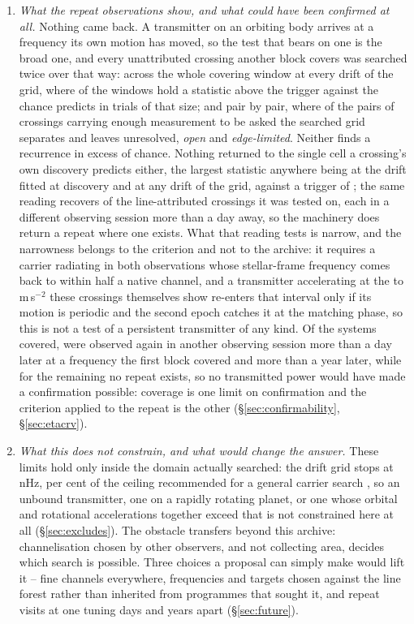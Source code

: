 \begin{enumerate}[leftmargin=1.6em,itemsep=4pt,topsep=4pt,parsep=0pt]
\item \emph{What the repeat observations show, and what could have been
confirmed at all.} Nothing came back. A transmitter on an orbiting body
arrives at a frequency its own motion has moved, so the test that bears on
one is the broad one, and every unattributed crossing another block covers
was searched twice over that way: across the whole covering window at every
drift of the grid, where \WdNExc{} of the \WdNCov{} windows hold a statistic
above the trigger against the \WdExpect{} chance predicts in trials of that
size; and pair by pair, where of the \TjNPair{} pairs of crossings carrying
enough measurement to be asked the searched grid separates \TjNExcl{} and
leaves \TjNOpen{} unresolved, \TjNOpenPlain{} \emph{open} and
\TjNPairEdge{} \emph{edge-limited}. Neither finds a recurrence in excess of
chance. Nothing returned to the single cell a crossing's own discovery
predicts either, the largest statistic anywhere being \RcTMatched{} at the
drift fitted at discovery and \RcTMax{} at any drift of the grid, against a
trigger of \StageNullTrig; the same reading recovers \MkAttrRecur{} of the
\MkAttrTested{} line-attributed crossings it was tested on, each in a
different observing session more than a day away, so the machinery does
return a repeat where one exists. What that reading tests is narrow, and the
narrowness belongs to the criterion and not to the archive: it requires a
carrier radiating in both observations whose stellar-frame frequency comes
back to within half a native channel, and a transmitter accelerating at the
\ZtALosLo{} to \ZtALosHi\,m\,s$^{-2}$ these crossings themselves show
re-enters that interval only if its motion is periodic and the second epoch
catches it at the matching phase, so this is not a test of a persistent
transmitter of any kind. Of the \NSysClassA{} systems covered,
\ZcConfSysDay{} were observed again in another observing session more than a
day later at a frequency the first block covered and \ZcConfSysYr{} more than
a year later, while for the remaining \ZcNoRepSys{} no repeat exists, so no
transmitted power would have made a confirmation possible: coverage is one
limit on confirmation and the criterion applied to the repeat is the other
(\S\ref{sec:confirmability}, \S\ref{sec:etacrv}).

\item \emph{What this does not constrain, and what would change the answer.}
These limits hold only inside the domain actually searched: the drift grid
stops at \DriftCeilLo\,nHz, \AccelSheikhPct{} per cent of the ceiling
recommended for a general carrier search \citep{Sheikh2019}, so an unbound
transmitter, one on a rapidly rotating planet, or one whose orbital and
rotational accelerations together exceed that is not constrained here at all
(\S\ref{sec:excludes}). The obstacle transfers beyond this archive:
channelisation chosen by other observers, and not collecting area, decides
which search is possible. Three choices a proposal can simply make would lift
it -- fine channels everywhere, frequencies and targets chosen against the
line forest rather than inherited from programmes that sought it, and repeat
visits at one tuning days and years apart (\S\ref{sec:future}).


\end{enumerate}
